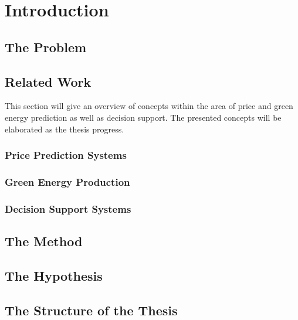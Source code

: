 \documentclass[twoside,11pt,openright]{report}
\begin{document}
\tableofcontents
{}
\setcounter{secnumdepth}{2}


\chapter{Introduction}
\label{ch:intro}
\section{The Problem}

\section{Related Work}
This section will give an overview of concepts within the area of price and green energy prediction as well as decision support. The presented concepts will be elaborated as the thesis progress.
\subsection{Price Prediction Systems}


\subsection{Green Energy Production}
\label{sec:greeEnergyProductionIntroduction}



\subsection{Decision Support Systems}


\section{The Method}


\section{The Hypothesis}
\label{sec:theHypothesis}


\newpage
\section{The Structure of the Thesis}
\label{sec:structureOfTheThesis}

\end{document}
